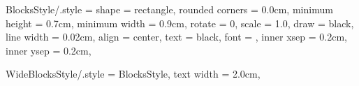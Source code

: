 
\tikzset
{
	BlocksStyle/.style =
	{
		shape			= rectangle,			%
		rounded corners	= 0.0cm,				%
		minimum height	= 0.7cm,				%
		minimum width	= 0.9cm,				%
		rotate			= 0,					%
		scale			= 1.0,					%
		draw			= black,				%
		line width		= 0.02cm,				%
		align			= center,				%
		text			= black,				%
		font			= \normalsize\normalfont,	%
		inner xsep		= 0.2cm,				%
		inner ysep		= 0.2cm,				%
	}
}



\tikzset
{
	WideBlocksStyle/.style =
	{
		BlocksStyle,
		text width		= 2.0cm,				%
	}
}
